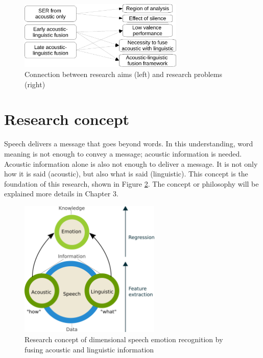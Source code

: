 \begin{figure}[htbp]
    \centering
    \includegraphics[width=0.7\textwidth]{../fig/aims_issues-crop.pdf}
    \caption{Connection between research aims (left) and research problems (right)}
    \label{fig:aims_issues}
\end{figure}

\section{Research concept}
Speech delivers a message that goes beyond words. In this understanding, word
meaning is not enough to convey a message; acoustic information is needed.
Acoustic information alone is also not enough to deliver a message. It is not
only how it is said (acoustic), but also what is said (linguistic).  This
concept is the foundation of this research, shown in Figure \ref{fig:concept}.
The concept or philosophy will be explained more details in Chapter 3.

\begin{figure}[htbp]
    \centering
    \includegraphics[width=0.6\textwidth]{../fig/concept-rev.pdf}
    \caption{Research concept of dimensional speech emotion recognition by fusing acoustic and linguistic information}
    \label{fig:concept}
\end{figure}


